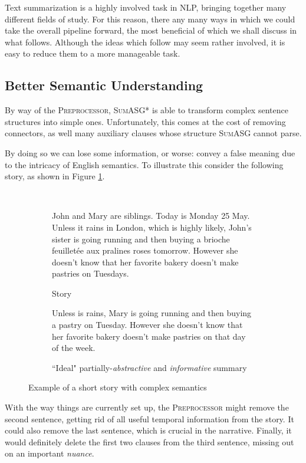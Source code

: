 Text summarization is a highly involved task in NLP, bringing together many different fields of study. For this reason, there any many ways in which we could take the overall pipeline forward, the most beneficial of which we shall discuss in what follows. Although the ideas which follow may seem rather involved, it is easy to reduce them to a more manageable task.

\subsection{Better Semantic Understanding}

By way of the \textsc{Preprocessor}, \textsc{SumASG*} is able to transform complex sentence structures into simple ones. Unfortunately, this comes at the cost of removing connectors, as well many auxiliary clauses whose structure \textsc{SumASG} cannot parse.

By doing so we can lose some information, or worse: convey a false meaning due to the intricacy of English semantics. To illustrate this consider the following story, as shown in Figure \ref{fig:complex_summary}.

\begin{figure}[H]\
\begin{subfigure}{\textwidth}
\begin{displayquote}
John and Mary are siblings. Today is Monday 25 May. Unless it rains in London, which is highly likely, John's sister is going running and then buying a brioche feuilletée aux pralines roses tomorrow. However she doesn't know that her favorite bakery doesn't make pastries on Tuesdays.
\end{displayquote}
\caption{Story}
\vspace{\baselineskip}
\end{subfigure}
\begin{subfigure}{\textwidth}
\begin{displayquote}
Unless is rains, Mary is going running and then buying a pastry on Tuesday. However she doesn't know that her favorite bakery doesn't make pastries on that day of the week.
\caption{``Ideal" partially-\textit{abstractive} and \textit{informative} summary}
\end{displayquote}
\end{subfigure}
\caption{Example of a short story with complex semantics}
\label{fig:complex_summary}
\end{figure}

With the way things are currently set up, the \textsc{Preprocessor} might remove the second sentence, getting rid of all useful temporal information from the story. It could also remove the last sentence, which is crucial in the narrative. Finally, it would definitely delete the first two clauses from the third sentence, missing out on an important \textit{nuance}.

